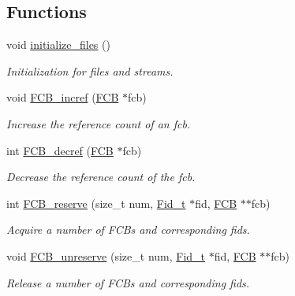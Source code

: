 \subsection*{Functions}
\begin{DoxyCompactItemize}
\item 
void \hyperlink{group__streams_ga147537248d983b0cc6cc7e8b39245f09}{initialize\+\_\+files} ()
\begin{DoxyCompactList}\small\item\em Initialization for files and streams. \end{DoxyCompactList}\item 
void \hyperlink{group__streams_ga409efca0b415dfdabe868c292d1daf66}{F\+C\+B\+\_\+incref} (\hyperlink{group__streams_ga0c7e751afb9d6cadebf070961804d400}{F\+CB} $\ast$fcb)
\begin{DoxyCompactList}\small\item\em Increase the reference count of an fcb. \end{DoxyCompactList}\item 
int \hyperlink{group__streams_ga26586eafc28dd1f2ac5bc7402922aa36}{F\+C\+B\+\_\+decref} (\hyperlink{group__streams_ga0c7e751afb9d6cadebf070961804d400}{F\+CB} $\ast$fcb)
\begin{DoxyCompactList}\small\item\em Decrease the reference count of the fcb. \end{DoxyCompactList}\item 
int \hyperlink{group__streams_ga462269376de145171b87b7bc3036e4f8}{F\+C\+B\+\_\+reserve} (size\+\_\+t num, \hyperlink{group__syscalls_ga5097222c5f0da97d92d4712359abc38f}{Fid\+\_\+t} $\ast$fid, \hyperlink{group__streams_ga0c7e751afb9d6cadebf070961804d400}{F\+CB} $\ast$$\ast$fcb)
\begin{DoxyCompactList}\small\item\em Acquire a number of F\+C\+Bs and corresponding fids. \end{DoxyCompactList}\item 
void \hyperlink{group__streams_gac44c094845a8d4e2e13f9df5b17274df}{F\+C\+B\+\_\+unreserve} (size\+\_\+t num, \hyperlink{group__syscalls_ga5097222c5f0da97d92d4712359abc38f}{Fid\+\_\+t} $\ast$fid, \hyperlink{group__streams_ga0c7e751afb9d6cadebf070961804d400}{F\+CB} $\ast$$\ast$fcb)
\begin{DoxyCompactList}\small\item\em Release a number of F\+C\+Bs and corresponding fids. \end{DoxyCompactList}\item 

\end{DoxyCompactItemize}
